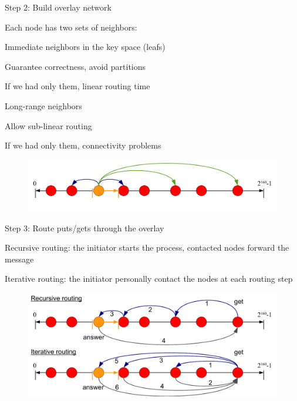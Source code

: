 \begin{frame}{Step 2: Build overlay network}

Each node has two sets of neighbors:
\BIL
\item Immediate neighbors in the key space (leafs)
  \BI
  \item Guarantee correctness, avoid partitions
  \item If we had only them, linear routing time
  \EI
\item Long-range neighbors
  \BI
  \item Allow sub-linear routing
  \item If we had only them, connectivity problems
  \EI
\EIL

\begin{figure}
	\includegraphics[width=\textwidth]{dht-overlay}
\end{figure}

\end{frame}

\begin{frame}{Step 3: Route puts/gets through the overlay}

\BI
\item \alert{Recursive routing}: the initiator starts the process, contacted
  nodes forward the message	
\item \alert{Iterative routing}: the initiator personally contact the nodes at each
  routing step
\EI

\begin{figure}
	\includegraphics[width=\textwidth]{dht-route}
\end{figure}

\end{frame}

